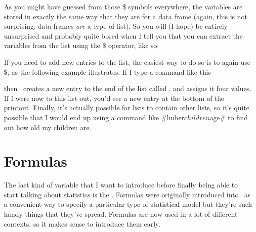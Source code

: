 As you might have guessed from those \$ symbols everywhere, the variables are stored in exactly the same way that they are for a data frame (again, this is not surprising: data frames {\it are} a type of list). So you will (I hope) be entirely unsurprised and probably quite bored when I tell you that you can extract the variables from the list using the \$ operator, like so:

If you need to add new entries to the list, the easiest way to do so is to again use \$, as the following example illustrates. If I type a command like this

then \R\ creates a new entry to the end of the list called , and assigns it four values. If I were now to  this list out, you'd see a new entry at the bottom of the printout. Finally, it's actually possible for lists to contain other lists, so it's quite possible that I would end up using a command like \rtextverb#huber$children$age# to find out how old my children are.


\section{Formulas\label{sec:formulas}}
 
The last kind of variable that I want to introduce before finally being able to start talking about statistics is the . Formulas were originally introduced into \R\ as a convenient way to specify a particular type of statistical model but they're such handy things that they've spread. Formulas are now used in a lot of different contexts, so it makes sense to introduce them early.

